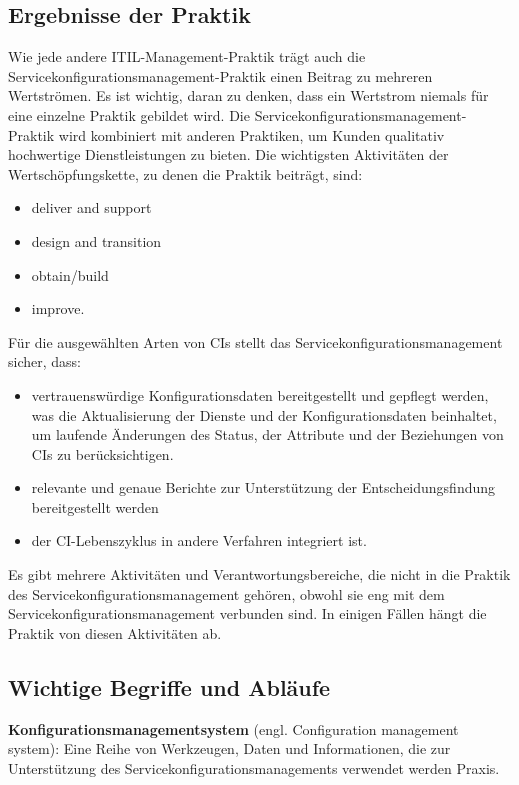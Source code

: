 \subsection{Ergebnisse der Praktik}
Wie jede andere ITIL-Management-Praktik trägt auch die Servicekonfigurationsmanagement-Praktik
einen Beitrag zu mehreren Wertströmen. Es ist wichtig, daran zu denken, dass ein Wertstrom niemals
für eine einzelne Praktik gebildet wird. Die Servicekonfigurationsmanagement-Praktik wird kombiniert mit anderen
Praktiken, um Kunden qualitativ hochwertige Dienstleistungen zu bieten. Die wichtigsten Aktivitäten der Wertschöpfungskette, zu denen
die Praktik beiträgt, sind:

\begin{itemize}
	\item deliver and support
	\item design and transition
	\item obtain/build
	\item improve.
\end{itemize}

\noindent
Für die ausgewählten Arten von CIs stellt das Servicekonfigurationsmanagement sicher, dass:

\begin{itemize}
	\item vertrauenswürdige Konfigurationsdaten bereitgestellt und gepflegt werden, was die Aktualisierung der Dienste und der Konfigurationsdaten beinhaltet, 
	um laufende Änderungen des Status, der Attribute und der Beziehungen von CIs zu berücksichtigen.
	\item relevante und genaue Berichte zur Unterstützung der Entscheidungsfindung bereitgestellt werden
	\item der CI-Lebenszyklus in andere Verfahren integriert ist.
\end{itemize}

\noindent
Es gibt mehrere Aktivitäten und Verantwortungsbereiche, die nicht in die Praktik 
des Servicekonfigurationsmanagement gehören, obwohl sie eng mit dem Servicekonfigurationsmanagement verbunden sind.
In einigen Fällen hängt die Praktik von diesen Aktivitäten ab. 

\subsection{Wichtige Begriffe und Abläufe}
\textbf{Konfigurationsmanagementsystem} (engl. Configuration management system):
Eine Reihe von Werkzeugen, Daten und Informationen, die zur Unterstützung des Servicekonfigurationsmanagements verwendet werden
Praxis. \\

